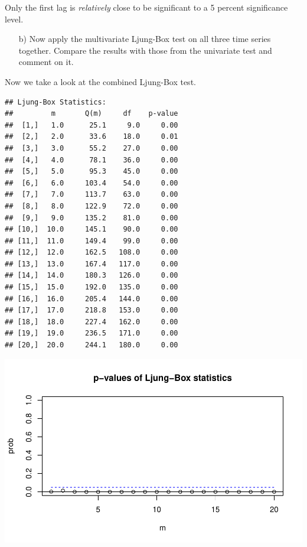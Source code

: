 \documentclass[12pt,a4paper]{article}
\newenvironment{Shaded}{\begin{snugshade}}{\end{snugshade}}
\newcommand{\DataTypeTok}[1]{\textcolor[rgb]{0.13,0.29,0.53}{#1}}
\newcommand{\DecValTok}[1]{\textcolor[rgb]{0.00,0.00,0.81}{#1}}
\newcommand{\KeywordTok}[1]{\textcolor[rgb]{0.13,0.29,0.53}{\textbf{#1}}}
\newcommand{\NormalTok}[1]{#1}
\newcommand{\OperatorTok}[1]{\textcolor[rgb]{0.81,0.36,0.00}{\textbf{#1}}}
\begin{document}
Only the first lag is \emph{relatively} close to be significant to a 5
percent significance level.

\begin{itemize}
  \item[b)] Now apply the multivariate Ljung-Box test on all three time series together. Compare the results with those from the univariate test and comment on it.
\end {itemize}

Now we take a look at the combined Ljung-Box test.

\begin{Shaded}
\end{Shaded}

\begin{verbatim}
## Ljung-Box Statistics:  
##         m       Q(m)     df    p-value
##  [1,]   1.0      25.1     9.0     0.00
##  [2,]   2.0      33.6    18.0     0.01
##  [3,]   3.0      55.2    27.0     0.00
##  [4,]   4.0      78.1    36.0     0.00
##  [5,]   5.0      95.3    45.0     0.00
##  [6,]   6.0     103.4    54.0     0.00
##  [7,]   7.0     113.7    63.0     0.00
##  [8,]   8.0     122.9    72.0     0.00
##  [9,]   9.0     135.2    81.0     0.00
## [10,]  10.0     145.1    90.0     0.00
## [11,]  11.0     149.4    99.0     0.00
## [12,]  12.0     162.5   108.0     0.00
## [13,]  13.0     167.4   117.0     0.00
## [14,]  14.0     180.3   126.0     0.00
## [15,]  15.0     192.0   135.0     0.00
## [16,]  16.0     205.4   144.0     0.00
## [17,]  17.0     218.8   153.0     0.00
## [18,]  18.0     227.4   162.0     0.00
## [19,]  19.0     236.5   171.0     0.00
## [20,]  20.0     244.1   180.0     0.00
\end{verbatim}

\includegraphics{solution_exercise_1_files/figure-latex/unnamed-chunk-6-1.pdf}
\end{document}
